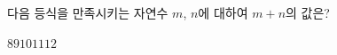 다음 등식을 만족시키는 자연수 $m$, $n$에 대하여 $m+n$의 값은? 
\begin{choices32}{$8$}{$9$}{$10$}{$11$}{$12$}\end{choices32}

